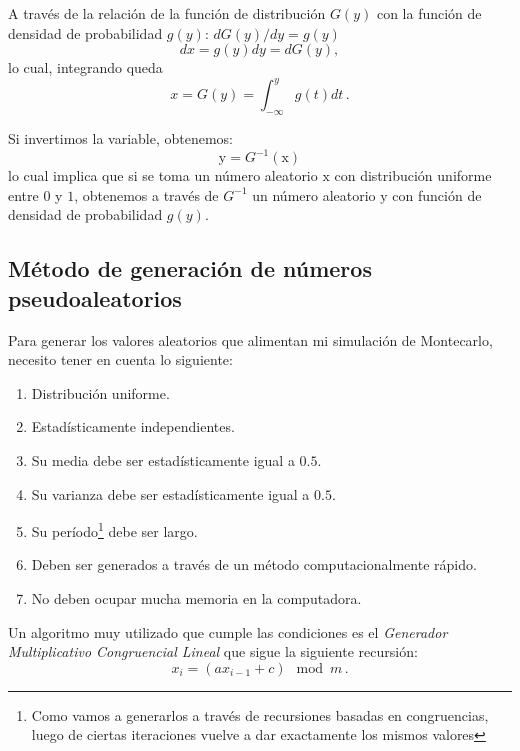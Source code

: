 \documentclass[openany]{book}
\begin{document}
\par A través de la relación de la función de distribución $G(y)$ con la función de densidad de probabilidad $g(y)$: $dG(y)/dy=g(y)$
\begin{equation*}
  dx=g(y)dy=dG(y),
\end{equation*}
lo cual, integrando queda
\begin{equation*}
  x=G(y)=\int_{-\infty}^{y}g(t)dt\,.
\end{equation*}
\par Si invertimos la variable, obtenemos:
\begin{equation}
  \label{eq:montecarlo-variable}
  \mathrm{y}=G^{-1}(\mathrm{x})
\end{equation}
lo cual implica que si se toma un número aleatorio $\mathrm{x}$ con distribución uniforme entre $0$ y $1$, obtenemos a través de $G^{-1}$ un número aleatorio $\mathrm{y}$ con función de densidad de probabilidad $g(y)$.

\subsection{Método de generación de números pseudoaleatorios}
Para generar los valores aleatorios que alimentan mi simulación de Montecarlo, necesito tener en cuenta lo siguiente:

\begin{enumerate}
  \item Distribución uniforme.
  \item Estadísticamente independientes.
  \item Su media debe ser estadísticamente igual a $0.5$.
  \item Su varianza debe ser estadísticamente igual a $0.5$.
  \item Su período\footnote{Como vamos a generarlos a través de recursiones basadas en congruencias, luego de ciertas iteraciones vuelve a dar exactamente los mismos valores} debe ser largo.
  \item Deben ser generados a través de un método computacionalmente rápido.
  \item No deben ocupar mucha memoria en la computadora.
\end{enumerate}

\par Un algoritmo muy utilizado que cumple las condiciones es el \emph{Generador Multiplicativo Congruencial Lineal} que sigue la siguiente recursión:
\begin{equation}
  \label{eq:LCG}
  x_{i}=(ax_{i-1}+c)\mod{m}\,.
\end{equation}
\end{document}
